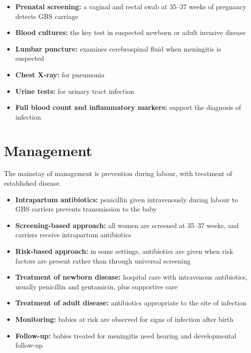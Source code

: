 \begin{itemize}
    \item \textbf{Prenatal screening:} a vaginal and rectal swab at 35--37 weeks of pregnancy detects GBS carriage
    \item \textbf{Blood cultures:} the key test in suspected newborn or adult invasive disease
    \item \textbf{Lumbar puncture:} examines cerebrospinal fluid when meningitis is suspected
    \item \textbf{Chest X-ray:} for pneumonia
    \item \textbf{Urine tests:} for urinary tract infection
    \item \textbf{Full blood count and inflammatory markers:} support the diagnosis of infection
\end{itemize}

\section*{Management}
The mainstay of management is prevention during labour, with treatment of established disease.

\begin{itemize}
    \item \textbf{Intrapartum antibiotics:} penicillin given intravenously during labour to GBS carriers prevents transmission to the baby
    \item \textbf{Screening-based approach:} all women are screened at 35--37 weeks, and carriers receive intrapartum antibiotics
    \item \textbf{Risk-based approach:} in some settings, antibiotics are given when risk factors are present rather than through universal screening
    \item \textbf{Treatment of newborn disease:} hospital care with intravenous antibiotics, usually penicillin and gentamicin, plus supportive care
    \item \textbf{Treatment of adult disease:} antibiotics appropriate to the site of infection
    \item \textbf{Monitoring:} babies at risk are observed for signs of infection after birth
    \item \textbf{Follow-up:} babies treated for meningitis need hearing and developmental follow-up
\end{itemize}

